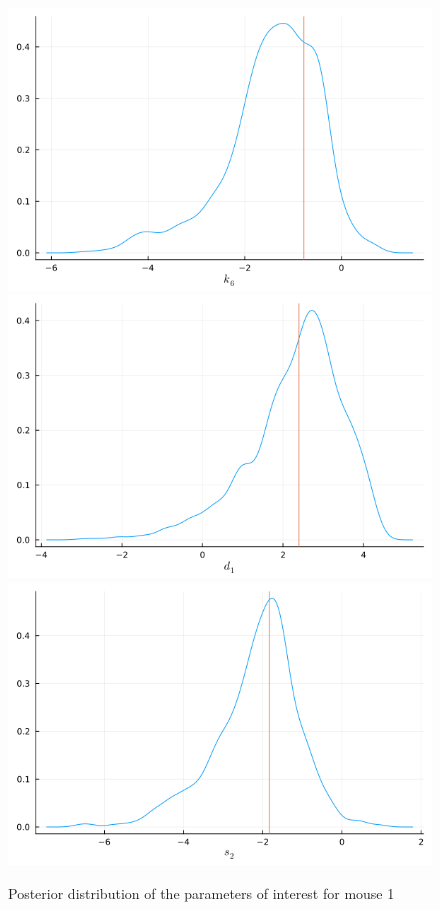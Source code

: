 \documentclass[11pt]{article}
\begin{document}
    \begin{figure}[!h]
        \centering
        \includegraphics[scale=0.4]{k6_1.png}
        \includegraphics[scale=0.4]{d1_1.png}
        \includegraphics[scale=0.4]{s2_1.png}
        \caption{Posterior distribution of the parameters of interest for mouse 1}
        \label{fig:ind_params}
    \end{figure}
    
\end{document}
